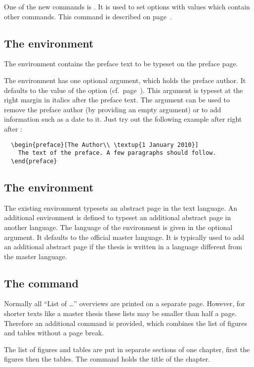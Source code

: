 One of the new commands is . It is used to set
options with values which contain other commands. This command is described
on page~\pageref{com:setup}.

\subsection[\env{preface}]{The  environment}
The  environment contains the preface text to be typeset on
the preface page.

The environment has one optional argument, which holds the preface author.
It defaults to the value of the  option (cf.\
page~\pageref{opt:author}). This argument is typeset at the right margin in
italics after the preface text. The argument can be used to remove the
preface author (by providing an empty argument) or to add information such as a
date to it. Just try out the following example after right after
\verb"":
\begin{verbatim}
  \begin{preface}[The Author\\ \textup{1 January 2010}]
    The text of the preface. A few paragraphs should follow.
  \end{preface}
\end{verbatim}

\subsection[]{The  environment}
The existing  environment typesets an abstract page in the
text language. An additional \env{abstract*} environment is defined to
typeset an additional abstract page in another language.
The language of the  environment is given in the optional
argument. It defaults to the official master language. It is typically used
to add an additional abstract page if the thesis is written in a language
different from the master language.

\subsection[]{%
  The \cs{listoffiguresandtables} command}
Normally all ``List of \ldots'' overviews are printed on a separate page.
However, for shorter texts like a master thesis these lists may be smaller
than half a page. Therefore an additional command
 is provided, which combines the list of
figures and tables without a page break.

The list of figures and tables are put in separate sections of one chapter,
first the figures then the tables. The command
 holds the title of the chapter.


